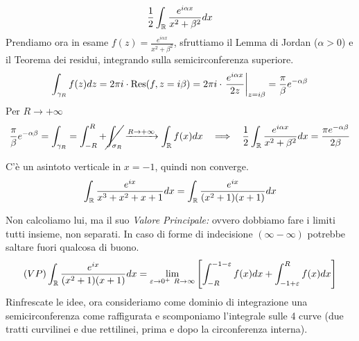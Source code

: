 \begin{equation*}
\frac{1}{2}\int _{\mathbb{R} }\frac{e^{i\alpha x}}{x^{2} + \beta ^{2}} dx
\end{equation*}Prendiamo ora in esame $f(z) = \frac{e^{i\alpha x}}{x^{2} + \beta ^{2}}$, sfruttiamo il Lemma di Jordan ($\alpha  > 0$) e il Teorema dei residui, integrando sulla semicirconferenza superiore.
\begin{equation*}
\int _{\gamma _{R}} f(z) dz = 2\pi i\cdot \operatorname{Res} (f,z = i\beta) = 2\pi i\cdot \left. \frac{e^{i\alpha x}}{2z}\right| _{z = i\beta } = \frac{\pi }{\beta } e^{ - \alpha \beta }
\end{equation*}
Per $R\rightarrow + \infty $
\begin{equation*}
\frac{\pi }{\beta } e^{ - \alpha \beta } = \int _{\gamma _{R}} = \int ^{R}_{ - R} + \cancel{\int _{\sigma _{R}}}\xrightarrow{R\rightarrow + \infty }\int _{\RR } f(x) dx\ \ \implies \ \ \frac{1}{2}\int _{\RR }\frac{e^{i\alpha x}}{x^{2} + \beta ^{2}} dx = \frac{\pi e^{ - \alpha \beta }}{2\beta }
\end{equation*}
\Soluzione

C'è un asintoto verticale in $x = -1$, quindi non converge.
\begin{equation*}
\int _{\mathbb{R} }\frac{e^{ix}}{x^{3} + x^{2} + x + 1} dx = \int _{\mathbb{R} }\frac{e^{ix}}{(x^{2} + 1)(x + 1)} dx
\end{equation*}

Non calcoliamo lui, ma il suo \textit{Valore Principale:} ovvero dobbiamo fare i limiti tutti insieme, non separati. In caso di forme di indecisione $(\infty - \infty)$ potrebbe saltare fuori qualcosa di buono.
\begin{equation*}
(VP)\int _{\mathbb{R} }\frac{e^{ix}}{(x^{2} + 1)(x + 1)} dx = \lim _{\varepsilon \rightarrow 0^{ + } \ R\rightarrow \infty }\left[\int ^{ - 1 - \varepsilon }_{ - R} f(x)dx + \int ^{R}_{ - 1 + \varepsilon } f(x)dx\right]
\end{equation*}
Rinfrescate le idee, ora consideriamo come dominio di integrazione una semicirconferenza come raffigurata e scomponiamo l'integrale sulle 4 curve (due tratti curvilinei e due rettilinei, prima e dopo la circonferenza interna).


